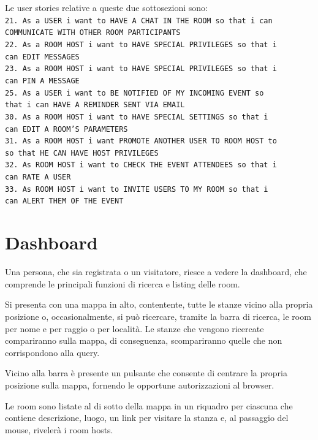 	Le user stories relative a queste due sottosezioni sono:\\
	\texttt{21. As a USER i want to HAVE A CHAT IN THE ROOM so that i can\\ COMMUNICATE WITH OTHER ROOM PARTICIPANTS}\\
	\texttt{22. As a ROOM HOST i want to HAVE SPECIAL PRIVILEGES so that i \\ can EDIT MESSAGES}\\
	\texttt{23. As a ROOM HOST i want to HAVE SPECIAL PRIVILEGES so that i \\ can PIN A MESSAGE}\\
	\texttt{25. As a USER i want to BE NOTIFIED OF MY INCOMING EVENT so \\ that i can HAVE A REMINDER SENT VIA EMAIL}\\
	\texttt{30. As a ROOM HOST i want to HAVE SPECIAL SETTINGS so that i \\ can EDIT A ROOM’S PARAMETERS}\\
	\texttt{31. As a ROOM HOST i want PROMOTE ANOTHER USER TO ROOM HOST to \\ so that HE CAN HAVE HOST PRIVILEGES}\\
	\texttt{32. As ROOM HOST i want to CHECK THE EVENT ATTENDEES so that i \\ can RATE A USER}\\
	\texttt{33. As ROOM HOST i want to INVITE USERS TO MY ROOM so that i \\ can ALERT THEM OF THE EVENT}
	
	\section{Dashboard}
	Una persona, che sia registrata o un visitatore, riesce a vedere la dashboard, che comprende le principali funzioni di ricerca e listing delle room.
	
	Si presenta con una mappa in alto, contentente, tutte le stanze vicino alla propria posizione o, occasionalmente, si può ricercare, tramite la barra di ricerca, le room per nome e per raggio o per località.
	Le stanze che vengono ricercate compariranno sulla mappa, di conseguenza, scompariranno quelle che non corrispondono alla query.
	
	Vicino alla barra è presente un pulsante che consente di centrare la propria posizione sulla mappa, fornendo le opportune autorizzazioni al browser.
	
	Le room sono listate al di sotto della mappa in un riquadro per ciascuna che contiene descrizione, luogo, un link per visitare la stanza e, al passaggio del mouse, rivelerà i room hosts.
	
